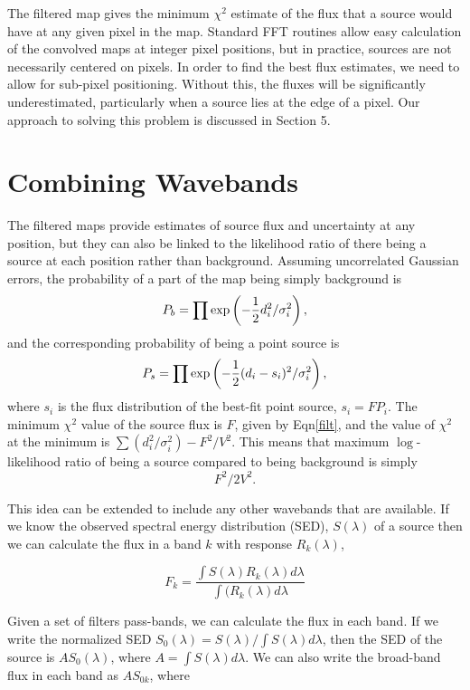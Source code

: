 \documentclass[useAMS,usenatbib]{mn2e}
\begin{document}
The filtered map gives the minimum $\chi^2$ estimate of the flux that a
source would have at any given pixel in the map. Standard FFT routines
allow easy calculation of the convolved maps at integer pixel
positions, but in practice, sources are not necessarily centered on
pixels. In order to find the best flux estimates, we need to allow for
sub-pixel positioning. Without this, the fluxes will be significantly
underestimated, particularly when a source lies at the edge of a
pixel. Our approach to solving this problem  is discussed in Section 5. 


\section{Combining Wavebands}

The filtered maps provide estimates of source flux and uncertainty at
any position, but they can also be linked to the likelihood ratio of
there being a source at each position rather than background. 
Assuming uncorrelated Gaussian errors, the probability of a part of the
map being simply background is
$$P_b =  \prod \exp \left( -{{1}\over{2}} d_i^2/\sigma_i^2 \right) ,$$
and the corresponding probability of being a point source is  
$$P_s = \prod \exp \left(-{{1}\over{2}} (d_i-s_i)^2/\sigma_i^2
\right), $$ where $s_i$ is the flux distribution of the best-fit point
source, $s_i = F P_i$. The minimum $\chi^2$ value of the source flux
is $F$, given by Eqn\ref{filt}, and the value of $\chi^2$ at the
minimum is $\sum (d_i^2/\sigma_i^2) - F^2/V^2 $.  This means that
maximum $\log$-likelihood ratio of being a source compared to being
background is simply
$$ F^2/2V^2.$$ 

This idea can be extended to include any other wavebands that are
available. If we know the observed spectral energy distribution (SED),
$S(\lambda)$ of a source then we can calculate the flux in a band $k$
with response $R_k(\lambda)$,

$$ F_k = \frac{\int S(\lambda) R_k(\lambda) d\lambda } {\int( R_k(\lambda)
  d\lambda } $$ 

Given a set of filters pass-bands, we can calculate the flux in each band. If we
write the normalized SED $S_0(\lambda)= S(\lambda) / \int S(\lambda)
d\lambda$, then the SED of the source is $A S_{0}(\lambda)$, where $A=\int
S(\lambda) d\lambda$. We can also write the broad-band flux in each
band as $AS_{0k}$, where 
\end{document}
